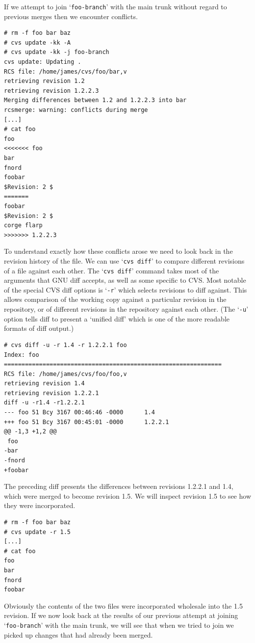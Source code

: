 \documentclass[12pt,letterpaper]{article}
\newcommand{\cmd}[1]{`\texttt{#1}'}
\begin{document}
If we attempt to join \cmd{foo-branch} with the main trunk without regard to
previous merges then we encounter conflicts.

\begin{Verbatim}
# rm -f foo bar baz
# cvs update -kk -A
# cvs update -kk -j foo-branch
cvs update: Updating .
RCS file: /home/james/cvs/foo/bar,v
retrieving revision 1.2
retrieving revision 1.2.2.3
Merging differences between 1.2 and 1.2.2.3 into bar
rcsmerge: warning: conflicts during merge
[...]
# cat foo
foo
<<<<<<< foo
bar
fnord
foobar
$Revision: 2 $
=======
foobar
$Revision: 2 $
corge flarp
>>>>>>> 1.2.2.3
\end{Verbatim}

To understand exactly how these conflicts arose we need to look back in the
revision history of the file.  We can use \cmd{cvs diff} to compare different
revisions of a file against each other.  The \cmd{cvs diff} command takes most
of the arguments that GNU diff accepts, as well as some specific to CVS.  Most
notable of the special CVS diff options is \cmd{-r} which selects revisions to
diff against.  This allows comparison of the working copy against a particular
revision in the repository, or of different revisions in the repository
against each other.  (The \cmd{-u} option tells diff to present a `unified
diff' which is one of the more readable formats of diff output.)

\begin{Verbatim}
# cvs diff -u -r 1.4 -r 1.2.2.1 foo
Index: foo
==============================================================
RCS file: /home/james/cvs/foo/foo,v
retrieving revision 1.4
retrieving revision 1.2.2.1
diff -u -r1.4 -r1.2.2.1
--- foo 51 Bcy 3167 00:46:46 -0000      1.4
+++ foo 51 Bcy 3167 00:45:01 -0000      1.2.2.1
@@ -1,3 +1,2 @@
 foo
-bar
-fnord
+foobar
\end{Verbatim}

The preceding diff presents the differences between revisions 1.2.2.1 and 1.4,
which were merged to become revision 1.5.  We will inspect revision 1.5 to see
how they were incorporated.

\begin{Verbatim}
# rm -f foo bar baz
# cvs update -r 1.5
[...]
# cat foo
foo
bar
fnord
foobar
\end{Verbatim}

Obviously the contents of the two files were incorporated wholesale into the
1.5 revision.  If we now look back at the results of our previous attempt at
joining \cmd{foo-branch} with the main trunk, we will see that when we tried
to join we picked up changes that had already been merged.
\end{document}
